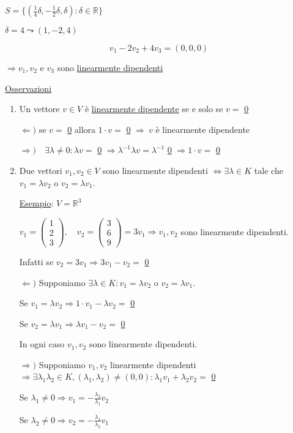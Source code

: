 \documentclass{article}
\newcommand{\ul}[1]{\underline{#1}}
\newcommand{\R}{\mathbb{R}}
\begin{document}
$S=\{(\frac{1}{4}\delta,-\frac{1}{2}\delta,\delta):\delta\in\R\}$

$\delta=4\leadsto(1,-2,4)$

$$v_1-2v_2+4v_3=(0,0,0)$$

$\Rightarrow v_1,v_2$ e $v_3$ sono \ul{linearmente dipendenti}

\ul{Osservazioni}
\begin{enumerate}
	\item Un vettore $v\in V$ è \ul{linearmente dipendente} se e solo se $v=$ \ul{0}

	  $\Leftarrow)$ se $v=$ \ul{0} allora $1\cdot v=$ \ul{0} $\Rightarrow\ v$ è linearmente dipendente

	  $\Rightarrow)\quad\exists\lambda\not=0:\lambda v=$ \ul{0} $\Rightarrow\lambda^{-1}\lambda v=\lambda^{-1}$ \ul{0} $\Rightarrow1\cdot v=$ \ul{0}
	\item Due vettori $v_1,v_2\in V$ sono linearmente dipendenti $\Leftrightarrow\exists\lambda\in K$ tale che $v_1=\lambda v_2$ o $v_2=\lambda v_1$.

	  \ul{Esempio}: $V=\R^3$

	  $v_1=\begin{pmatrix}1\\2\\3\end{pmatrix},\quad v_2=\begin{pmatrix}3\\6\\9\end{pmatrix}=3v_1\Rightarrow v_1,v_2$ sono linearmente dipendenti.

	  Infatti se $v_2=3v_1\Rightarrow3v_1-v_2=$ \ul{0}

	  $\Leftarrow)$ Supponiamo $\exists\lambda\in K:v_1=\lambda v_2$ o $v_2=\lambda v_1$.

	  Se $v_1=\lambda v_2\Rightarrow1\cdot v_1-\lambda v_2=$ \ul{0}

	  Se $v_2=\lambda v_1\Rightarrow\lambda v_1-v_2=$ \ul{0}

	  In ogni caso $v_1,v_2$ sono linearmente dipendenti.

	  $\Rightarrow)$ Supponiamo $v_1,v_2$ linearmente dipendenti $\Rightarrow\exists\lambda_1\lambda_2\in K,(\lambda_1,\lambda_2)\not=(0,0):\lambda_1v_1+\lambda_2v_2=$ \ul{0}

	  Se $\lambda_1\not=0\Rightarrow v_1=-\frac{\lambda_2}{\lambda_1}v_2$

	  Se $\lambda_2\not=0\Rightarrow v_2=-\frac{\lambda_1}{\lambda_2}v_1$


\end{enumerate}
\end{document}
